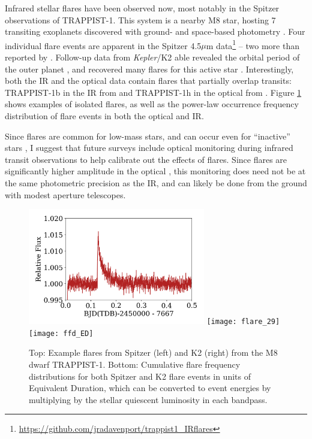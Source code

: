 \documentclass[]{rnaastex}
\newcommand{\Kepler}{\textsl{Kepler}\xspace}
\begin{document}
Infrared stellar flares have been observed now, most notably in the Spitzer observations of TRAPPIST-1. This system is a nearby M8 star, hosting 7 transiting exoplanets discovered with ground- and space-based photometry \citep{gillon2016,gillon2017}. Four individual flare events are apparent in the Spitzer 4.5$\mu$m data\footnote{\url{https://github.com/jradavenport/trappist1_IRflares}} -- two more than reported by \citet{gillon2017}.
Follow-up data from \Kepler/K2 able revealed the orbital period of the outer planet \citep{luger2017}, and recovered many flares for this active star \citep{vida2017}. 
Interestingly, both the IR and the optical data contain flares that partially overlap transits: TRAPPIST-1b in the IR from \citet{gillon2017} and TRAPPIST-1h in the optical from \citet{luger2017}.
Figure \ref{fig:1} shows examples of isolated flares, as well as the power-law occurrence frequency distribution of flare events in both the optical and IR.




Since flares are common for low-mass stars, and can occur even for ``inactive'' stars \citep[e.g.][]{hawley2014}, I suggest that future surveys include optical monitoring during infrared transit observations to help calibrate out the effects of flares. Since flares are significantly higher amplitude in the optical \citep{davenport2012}, this monitoring does need not be at the same photometric precision as the IR, and can likely be done from the ground with modest aperture telescopes.



\begin{figure}[h!]
\begin{center}
\includegraphics[height=2in]{trappist1_flare3}
\texttt{[image: flare\_29]}\\
\texttt{[image: ffd\_ED]}
\caption{Top: Example flares from Spitzer (left) and K2 (right) from the M8 dwarf TRAPPIST-1. 
Bottom: Cumulative flare frequency distributions for both Spitzer and K2 flare events in units of Equivalent Duration, which can be converted to event energies by multiplying by the stellar quiescent luminosity in each bandpass. 
\label{fig:1}}
\end{center}
\end{figure}
\end{document}
